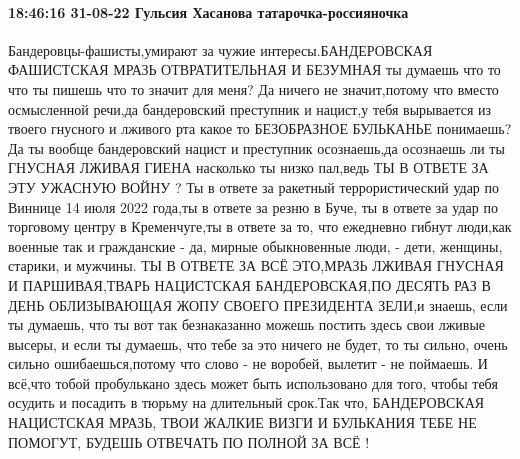  
 
 
 
 

\paragraph{18:46:16 31-08-22 Гульсия Хасанова татарочка-россияночка}

Бандеровцы-фашисты,умирают за чужие интересы.БАНДЕРОВСКАЯ ФАШИСТСКАЯ МРАЗЬ
ОТВРАТИТЕЛЬНАЯ И БЕЗУМНАЯ ты думаешь что то что ты пишешь что то значит для
меня? Да ничего не значит,потому что вместо осмысленной речи,да бандеровский
преступник и нацист,у тебя вырывается из твоего гнусного и лживого рта какое то
БЕЗОБРАЗНОЕ БУЛЬКАНЬЕ понимаешь? Да ты вообще бандеровский нацист и преступник
осознаешь,да осознаешь ли ты ГНУСНАЯ ЛЖИВАЯ ГИЕНА насколько ты низко пал,ведь
ТЫ В ОТВЕТЕ ЗА ЭТУ УЖАСНУЮ ВОЙНУ ? Ты в ответе за ракетный террористический
удар по Виннице 14 июля 2022 года,ты в ответе за резню в Буче, ты в ответе за
удар по торговому центру в Кременчуге,ты в ответе за то, что ежедневно гибнут
люди,как военные так и гражданские - да, мирные обыкновенные люди, - дети,
женщины, старики, и мужчины. ТЫ В ОТВЕТЕ ЗА ВСЁ ЭТО,МРАЗЬ ЛЖИВАЯ ГНУСНАЯ И
ПАРШИВАЯ,ТВАРЬ НАЦИСТСКАЯ БАНДЕРОВСКАЯ,ПО ДЕСЯТЬ РАЗ В ДЕНЬ ОБЛИЗЫВАЮЩАЯ ЖОПУ
СВОЕГО ПРЕЗИДЕНТА ЗЕЛИ,и знаешь, если ты думаешь, что ты вот так безнаказанно
можешь постить здесь свои лживые высеры, и если ты думаешь, что тебе за это
ничего не будет, то ты сильно, очень сильно ошибаешься,потому что слово - не
воробей, вылетит - не поймаешь. И всё,что тобой пробулькано здесь может быть
использовано для того, чтобы тебя осудить и посадить в тюрьму на длительный
срок.Так что, БАНДЕРОВСКАЯ НАЦИСТСКАЯ МРАЗЬ, ТВОИ ЖАЛКИЕ ВИЗГИ И БУЛЬКАНИЯ ТЕБЕ
НЕ ПОМОГУТ, БУДЕШЬ ОТВЕЧАТЬ ПО ПОЛНОЙ ЗА ВСЁ !

